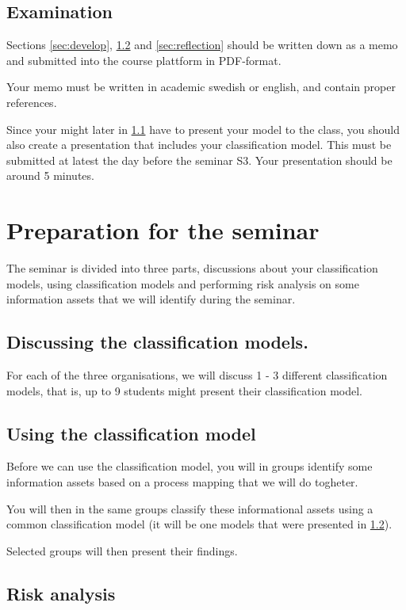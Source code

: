 \documentclass[a4paper]{llncs}
\begin{document}
\subsection{Examination}
Sections \ref{sec:develop}, \ref{sec:use} and \ref{sec:reflection} should be
written down as a memo and submitted into the course plattform in PDF-format.

Your memo must be written in academic swedish or english, and contain proper
references.

Since your might later in \ref{sec:present} have to present your model to the
class, you should also create a presentation that includes your classification
model. This must be submitted at latest the day before the seminar S3. Your
presentation should be around 5 minutes.

\section{Preparation for the seminar}

The seminar is divided into three parts, discussions about your classification
models, using classification models and performing risk analysis on some
information assets that we will identify during the seminar.

\subsection{Discussing the classification models.}
\label{sec:present}

For each of the three organisations, we will discuss 1 - 3 different
classification models, that is, up to 9 students might present their
classification model.

\subsection{Using the classification model}
\label{sec:use}

Before we can use the classification model, you will in groups identify some
information assets based on a process mapping that we will do togheter.

You will then in the same groups classify these informational assets using a
common classification model (it will be one models that were presented in
\ref{sec:use}).

Selected groups will then present their findings.

\subsection{Risk analysis}
\label{sec:risk}
\end{document}
